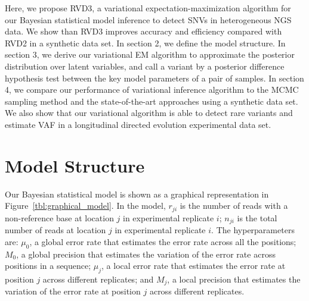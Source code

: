 \documentclass[11pt,reqno]{amsart}
\begin{document}
Here, we propose RVD3, a variational expectation-maximization algorithm for our Bayesian statistical model inference to detect SNVs in heterogeneous NGS data.
We show than RVD3 improves accuracy and efficiency compared with RVD2 in a synthetic data set.
In section 2, we define the model structure.
In section 3, we derive our variational EM algorithm to approximate the posterior distribution over latent variables, and call a variant by a posterior difference hypothesis test between the key model parameters of a pair of samples.
In section 4, we compare our performance of variational inference algorithm to the MCMC sampling method and the state-of-the-art approaches using a synthetic data set.
We also show that our variational algorithm is able to detect rare variants and estimate VAF in a longitudinal directed evolution experimental data set.

\section{Model Structure}
Our Bayesian statistical model is shown as a graphical representation in Figure~\ref{tbl:graphical_model}.
In the model, $r_{ji}$ is the number of reads with a non-reference base at location $j$ in experimental replicate $i$; $n_{ji}$ is the total number of reads at location $j$ in experimental replicate $i$.
The hyperparameters are:
$\mu_0$, a global error rate that estimates the error rate across all the positions;
$M_0$, a global precision that estimates the variation of the error rate across positions in a sequence;
$ \mu_j $, a local error rate that estimates the error rate at position $j$ across different replicates;
and $M_j$, a local precision that estimates the variation of the error rate at position $j$ across different replicates.
\end{document}
